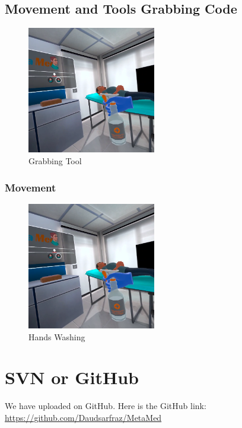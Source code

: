 \subsection{Movement and Tools Grabbing Code}
\begin{figure}[h]
	\centering
	\includegraphics[width=0.5\textwidth, height=0.3\textheight]{Images/Grabbing Tool.png}
	\caption{Grabbing Tool}
	\label{fig:Grabbing-Tool}
\end{figure}

\subsubsection{Movement}
\begin{figure}[h]
	\centering
	\includegraphics[width=0.5\textwidth, height=0.3\textheight]{Images/Washing hands.png}
	\caption{Hands Washing}
	\label{fig:Hands Washing}
\end{figure}

\section{SVN or GitHub}
We have uploaded on GitHub. Here is the GitHub link: \\
\href{https://github.com/Daudsarfraz/MetaMed}{https://github.com/Daudsarfraz/MetaMed}
